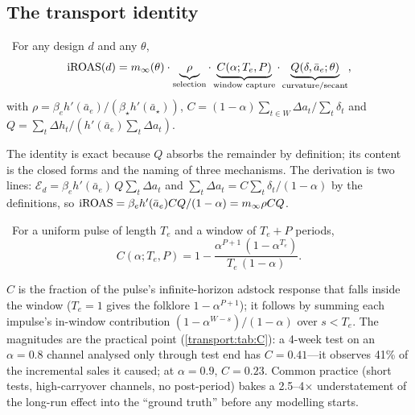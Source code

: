 \subsection{The transport identity}

\begin{theorem}
\label{transport:thm:identity}
\tagEstablished\ For any design $d$ and any $\theta$,
\begin{equation}
\mathrm{iROAS}(d) = m_\infty(\theta)\cdot\underbrace{\rho}_{\text{selection}}\cdot\underbrace{C(\alpha; T_e, P)}_{\text{window capture}}\cdot\underbrace{Q(\delta, \bar a_e; \theta)}_{\text{curvature/secant}},
\label{eq:transport:identity}
\end{equation}
with $\rho = \beta_e h'(\bar a_e)/(\beta_\star h'(\bar a_\star))$, $C = (1-\alpha)\sum_{t \in W}\Delta a_t/\sum_t \delta_t$ and $Q = \sum_t \Delta h_t/(h'(\bar a_e)\sum_t \Delta a_t)$.
\end{theorem}

The identity is exact because $Q$ absorbs the remainder by definition; its content is the closed forms and the naming of three mechanisms. The derivation is two lines: $\mathcal E_d = \beta_e h'(\bar a_e)\,Q\sum_t\Delta a_t$ and $\sum_t \Delta a_t = C\sum_t\delta_t/(1-\alpha)$ by the definitions, so $\mathrm{iROAS} = \beta_e h'(\bar a_e)CQ/(1-\alpha) = m_\infty\rho CQ$.

\begin{lemma}
\label{transport:lem:C}
\tagEstablished\ For a uniform pulse of length $T_e$ and a window of $T_e + P$ periods,
\begin{equation}
C(\alpha; T_e, P) = 1 - \frac{\alpha^{P+1}\,(1-\alpha^{T_e})}{T_e\,(1-\alpha)}.
\label{eq:transport:C}
\end{equation}
\end{lemma}

$C$ is the fraction of the pulse's infinite-horizon adstock response that falls inside the window ($T_e = 1$ gives the folklore $1 - \alpha^{P+1}$); it follows by summing each impulse's in-window contribution $(1-\alpha^{W-s})/(1-\alpha)$ over $s < T_e$. The magnitudes are the practical point (\cref{transport:tab:C}): a 4-week test on an $\alpha = 0.8$ channel analysed only through test end has $C = 0.41$---it observes 41\% of the incremental sales it caused; at $\alpha = 0.9$, $C = 0.23$. Common practice (short tests, high-carryover channels, no post-period) bakes a 2.5--4$\times$ understatement of the long-run effect into the ``ground truth'' before any modelling starts.

